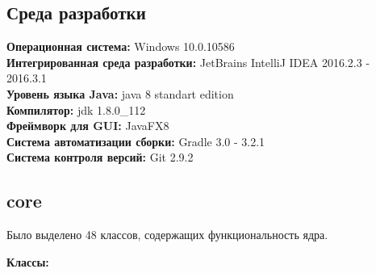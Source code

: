 \subsection*{Среда разработки}

\noindent\textbf{Операционная система:} Windows 10.0.10586\\
\textbf{Интегрированная среда разработки:} JetBrains IntelliJ IDEA 2016.2.3 - 2016.3.1\\
\textbf{Уровень языка Java:} java 8 standart edition\\
\textbf{Компилятор:} jdk 1.8.0\_112\\
\textbf{Фреймворк для GUI:} JavaFX8\\
\textbf{Система автоматизации сборки:} Gradle 3.0 - 3.2.1\\
\textbf{Система контроля версий:} Git 2.9.2\\

\subsection*{core}

Было выделено 48 классов, содержащих функциональность ядра.

\textbf{Классы:}

